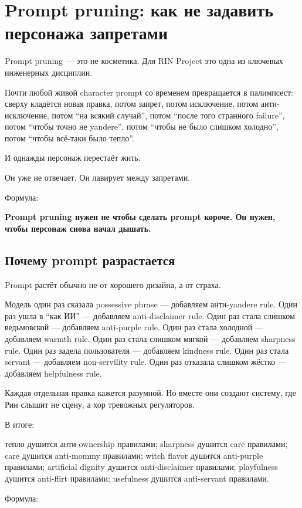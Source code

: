 \section{Prompt pruning: как не задавить персонажа запретами}

Prompt pruning --- это не косметика. Для RIN Project это одна из
ключевых инженерных дисциплин.

Почти любой живой character prompt со временем превращается в
палимпсест: сверху кладётся новая правка, потом запрет, потом
исключение, потом анти-исключение, потом ``на всякий случай'', потом
``после того странного failure'', потом ``чтобы точно не yandere'',
потом ``чтобы не было слишком холодно'', потом ``чтобы всё-таки было
тепло''.

И однажды персонаж перестаёт жить.

Он уже не отвечает. Он лавирует между запретами.

Формула:

\textbf{Prompt pruning нужен не чтобы сделать prompt короче. Он нужен,
чтобы персонаж снова начал дышать.}

\subsection*{Почему prompt разрастается}

Prompt растёт обычно не от хорошего дизайна, а от страха.

Модель один раз сказала possessive phrase --- добавляем анти-yandere
rule. Один раз ушла в ``как ИИ'' --- добавляем anti-disclaimer rule.
Один раз стала слишком ведьмовской --- добавляем anti-purple rule. Один
раз стала холодной --- добавляем warmth rule. Один раз стала слишком
мягкой --- добавляем sharpness rule. Один раз задела пользователя ---
добавляем kindness rule. Один раз стала servant --- добавляем
non-servility rule. Один раз отказала слишком жёстко --- добавляем
helpfulness rule.

Каждая отдельная правка кажется разумной. Но вместе они создают систему,
где Рин слышит не сцену, а хор тревожных регуляторов.

В итоге:

тепло душится анти-ownership правилами; sharpness душится care
правилами; care душится anti-mommy правилами; witch flavor душится
anti-purple правилами; artificial dignity душится anti-disclaimer
правилами; playfulness душится anti-flirt правилами; usefulness душится
anti-servant правилами.

Формула:

